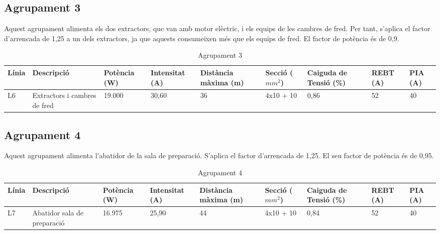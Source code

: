 \subsection{Agrupament 3}
Aquest agrupament alimenta els dos extractors, que van amb motor elèctric, i els equips de les cambres de fred. Per tant, s'aplica el factor d'arrencada de 1,25 a un dels extractors, ja que aquests consumeixen més que els equips de fred. El factor de potència és de 0,9.
\begin{table}[H]
\small
\begin{center}
 \begin{tabu} to \textwidth {|X[0.5, l]|X[2, l]|X[r]|X[r]|X[r]|X[r]|X[r]|X[r]|X[0.5,r]|}%
 \hline
 Línia& Descripció & Potència (W) & Intensitat (A) & Distància màxima (m) & Secció ($mm^{2}$) & Caiguda de Tensió (\%) & REBT (A)& PIA (A)\\
 \hline \hline 
L6 & Extractors i cambres de fred & 19.000 & 30,60 & 36 &4x10 + 10& 0,86 & 52 & 40 \\
 \hline
 \end{tabu}
 \caption{Agrupament 3}
\end{center}
\end{table}

\subsection{Agrupament 4}
Aquest agrupament alimenta l'abatidor de la sala de preparació. S'aplica el factor d'arrencada de 1,25. El seu factor de potència és de 0,95.
\begin{table}[H]
\small
\begin{center}
 \begin{tabu} to \textwidth {|X[0.5, l]|X[2, l]|X[r]|X[r]|X[r]|X[r]|X[r]|X[r]|X[0.5,r]|}%
 \hline
 Línia& Descripció & Potència (W) & Intensitat (A) & Distància màxima (m) & Secció ($mm^{2}$) & Caiguda de Tensió (\%) & REBT (A)& PIA (A)\\
 \hline \hline 
L7 & Abatidor sala de preparació & 16.975 & 25,90 & 44 &4x10 + 10& 0,84 & 52 & 40 \\
 \hline
 \end{tabu}
 \caption{Agrupament 4}
\end{center}
\end{table}
%
%

